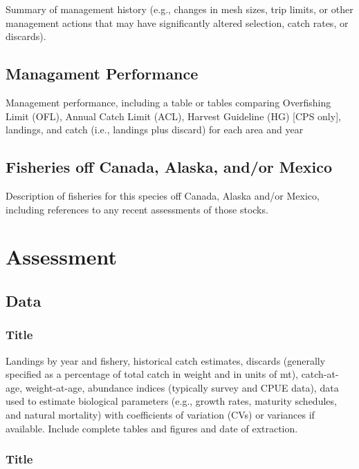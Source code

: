 \documentclass[12pt,]{article}
\begin{document}
Summary of management history (e.g., changes in mesh sizes, trip limits,
or other management actions that may have significantly altered
selection, catch rates, or discards).

\subsection{Managament Performance}\label{managament-performance}

Management performance, including a table or tables comparing
Overfishing Limit (OFL), Annual Catch Limit (ACL), Harvest Guideline
(HG) {[}CPS only{]}, landings, and catch (i.e., landings plus discard)
for each area and year

\subsection{Fisheries off Canada, Alaska, and/or
Mexico}\label{fisheries-off-canada-alaska-andor-mexico}

Description of fisheries for this species off Canada, Alaska and/or
Mexico, including references to any recent assessments of those stocks.

\section{Assessment}\label{assessment}

\subsection{Data}\label{data}

\subsubsection{Title}\label{title}

Landings by year and fishery, historical catch estimates, discards
(generally specified as a percentage of total catch in weight and in
units of mt), catch-at-age, weight-at-age, abundance indices (typically
survey and CPUE data), data used to estimate biological parameters
(e.g., growth rates, maturity schedules, and natural mortality) with
coefficients of variation (CVs) or variances if available. Include
complete tables and figures and date of extraction.

\subsubsection{Title}\label{title-1}
\end{document}
